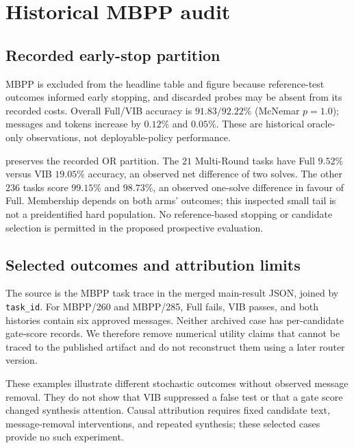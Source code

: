 \documentclass[11pt,twoside,twocolumn,letterpaper]{article}
\begin{document}

\clearpage
\appendix
\section{Historical MBPP audit}\label{app:gate_trace}

\subsection{Recorded early-stop partition}


MBPP is excluded from the headline table and figure because reference-test outcomes informed early stopping, and discarded probes may be absent from its recorded costs. Overall Full/VIB accuracy is $91.83/92.22\%$ (McNemar $p=1.0$); messages and tokens increase by $0.12\%$ and $0.05\%$. These are historical oracle-only observations, not deployable-policy performance.

 preserves the recorded OR partition. The $21$ Multi-Round tasks have Full $9.52\%$ versus VIB $19.05\%$ accuracy, an observed net difference of two solves. The other $236$ tasks score $99.15\%$ and $98.73\%$, an observed one-solve difference in favour of Full. Membership depends on both arms' outcomes; this inspected small tail is not a preidentified hard population. No reference-based stopping or candidate selection is permitted in the proposed prospective evaluation.

\subsection{Selected outcomes and attribution limits}\label{sec:cases}

The source is the MBPP task trace in the merged main-result JSON, joined by \texttt{task\_id}. For MBPP/260 and MBPP/285, Full fails, VIB passes, and both histories contain six approved messages. Neither archived case has per-candidate gate-score records. We therefore remove numerical utility claims that cannot be traced to the published artifact and do not reconstruct them using a later router version.

These examples illustrate different stochastic outcomes without observed message removal. They do not show that VIB suppressed a false test or that a gate score changed synthesis attention. Causal attribution requires fixed candidate text, message-removal interventions, and repeated synthesis; these selected cases provide no such experiment.
\end{document}
